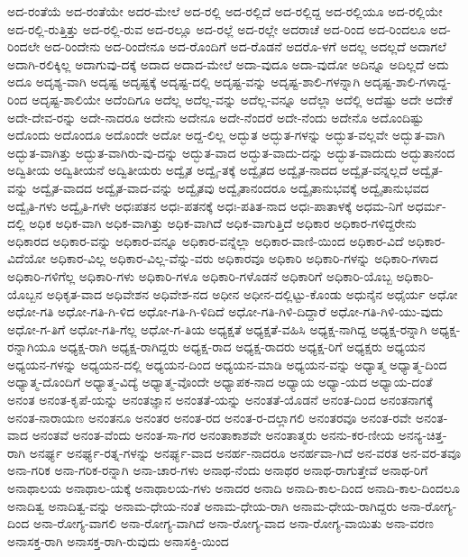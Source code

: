 {ಅದ-ರಂತೆಯೆ
ಅದ-ರಂತೆಯೇ
ಅದರ-ಮೇಲೆ
ಅದ-ರಲ್ಲಿ
ಅದ-ರಲ್ಲಿದೆ
ಅದ-ರಲ್ಲಿದ್ದ
ಅದ-ರಲ್ಲಿಯೂ
ಅದ-ರಲ್ಲಿಯೇ
ಅದ-ರಲ್ಲಿ-ರುತ್ತಿತ್ತು
ಅದ-ರಲ್ಲಿ-ರುವ
ಅದ-ರಲ್ಲೂ
ಅದ-ರಲ್ಲೆ
ಅದ-ರಲ್ಲೇ
ಅದರಾಚೆ
ಅದ-ರಿಂದ
ಅದ-ರಿಂದಲೂ
ಅದ-ರಿಂದಲೇ
ಅದ-ರಿಂದೇನು
ಅದ-ರಿಂದೇನೂ
ಅದ-ರೊಂದಿಗೆ
ಅದ-ರೊಡನೆ
ಅದರೊ-ಳಗೆ
ಅದಲ್ಲ
ಅದಲ್ಲದೆ
ಅದಾಗಲೆ
ಅದಾಗಿ-ರಲಿಕ್ಕಿಲ್ಲ
ಅದಾಗುವು-ದಕ್ಕೆ
ಅದಾದ
ಅದಾದ-ಮೇಲೆ
ಅದಾ-ವುದೂ
ಅದಾ-ವುದೋ
ಅದಿನ್ನೂ
ಅದಿಲ್ಲದೆ
ಅದು
ಅದೂ
ಅದೃಶ್ಯ-ವಾಗಿ
ಅದೃಷ್ಟ
ಅದೃಷ್ಟಕ್ಕೆ
ಅದೃಷ್ಟ-ದಲ್ಲಿ
ಅದೃಷ್ಟ-ವನ್ನು
ಅದೃಷ್ಟ-ಶಾಲಿ-ಗಳನ್ನಾಗಿ
ಅದೃಷ್ಟ-ಶಾಲಿ-ಗಳಾದ್ದ-ರಿಂದ
ಅದೃಷ್ಟ-ಶಾಲಿಯೇ
ಅದೆಂದಿಗೂ
ಅದೆಲ್ಲ
ಅದೆಲ್ಲ-ವನ್ನು
ಅದೆಲ್ಲ-ವನ್ನೂ
ಅದೆಲ್ಲಾ
ಅದೆಲ್ಲಿ
ಅದೆಷ್ಟು
ಅದೇ
ಅದೇಕೆ
ಅದೇ-ದೇವ-ರನ್ನು
ಅದೇ-ನಾದರೂ
ಅದೇನು
ಅದೇನೂ
ಅದೇ-ನೆಂದರೆ
ಅದೇ-ನೆಂದು
ಅದೇನೊ
ಅದೊಂದಿಷ್ಟು
ಅದೊಂದು
ಅದೊಂದೂ
ಅದೊಂದೇ
ಅದೋ
ಅದ್ದ-ಲಿಲ್ಲ
ಅದ್ಭುತ
ಅದ್ಭುತ-ಗಳನ್ನು
ಅದ್ಭುತ-ವಲ್ಲವೇ
ಅದ್ಭುತ-ವಾಗಿ
ಅದ್ಭುತ-ವಾಗಿತ್ತು
ಅದ್ಭುತ-ವಾಗಿರು-ವು-ದನ್ನು
ಅದ್ಭುತ-ವಾದ
ಅದ್ಭುತ-ವಾದು-ದನ್ನು
ಅದ್ಭುತ-ವಾದುದು
ಅದ್ಭುತಾನಂದ
ಅದ್ವಿತೀಯ
ಅದ್ವಿತೀಯನೆ
ಅದ್ವಿತೀಯರು
ಅದ್ವೈತ
ಅದ್ವೈ-ತಕ್ಕೆ
ಅದ್ವೈತದ
ಅದ್ವೈತ-ನಾದದ
ಅದ್ವೈತ-ವನ್ನಲ್ಲದೆ
ಅದ್ವೈತ-ವನ್ನು
ಅದ್ವೈತ-ವಾದದ
ಅದ್ವೈತ-ವಾದ-ವನ್ನು
ಅದ್ವೈತವು
ಅದ್ವೈತಾನಂದರೂ
ಅದ್ವೈತಾನುಭವಕ್ಕೆ
ಅದ್ವೈತಾನುಭವದ
ಅದ್ವೈತಿ-ಗಳು
ಅದ್ವೈತಿ-ಗಳೇ
ಅಧಃಪತನ
ಅಧಃ-ಪತನಕ್ಕೆ
ಅಧಃ-ಪತಿತ-ನಾದ
ಅಧಃ-ಪಾತಾಳಕ್ಕೆ
ಅಧಮ-ನಿಗೆ
ಅಧರ್ಮ-ದಲ್ಲಿ
ಅಧಿಕ
ಅಧಿಕ-ವಾಗಿ
ಅಧಿಕ-ವಾಗಿತ್ತು
ಅಧಿಕ-ವಾಗಿದೆ
ಅಧಿಕ-ವಾಗುತ್ತಿದೆ
ಅಧಿಕಾರ
ಅಧಿಕಾರ-ಗಳಿದ್ದರೇನು
ಅಧಿಕಾರದ
ಅಧಿಕಾರ-ವನ್ನು
ಅಧಿಕಾರ-ವನ್ನೂ
ಅಧಿಕಾರ-ವನ್ನೆಲ್ಲಾ
ಅಧಿಕಾರ-ವಾಣಿ-ಯಿಂದ
ಅಧಿಕಾರ-ವಿದೆ
ಅಧಿಕಾರ-ವಿದೆಯೋ
ಅಧಿಕಾರ-ವಿಲ್ಲ
ಅಧಿಕಾರ-ವಿಲ್ಲ-ವೆನ್ನು-ವರು
ಅಧಿಕಾರವೂ
ಅಧಿಕಾರಿ
ಅಧಿಕಾರಿ-ಗಳನ್ನು
ಅಧಿಕಾರಿ-ಗಳಾದ
ಅಧಿಕಾರಿ-ಗಳಿಗೆಲ್ಲ
ಅಧಿಕಾರಿ-ಗಳು
ಅಧಿಕಾರಿ-ಗಳೂ
ಅಧಿಕಾರಿ-ಗಳೊಡನೆ
ಅಧಿಕಾರಿಗೆ
ಅಧಿಕಾರಿ-ಯೊಬ್ಬ
ಅಧಿಕಾರಿ-ಯೊಬ್ಬನ
ಅಧಿಕೃತ-ವಾದ
ಅಧಿವೇಶನ
ಅಧಿವೇಶ-ನದ
ಅಧೀನ
ಅಧೀನ-ದಲ್ಲಿಟ್ಟು-ಕೊಂಡು
ಅಧುನೈನ
ಅಧೈರ್ಯ
ಅಧೋ
ಅಧೋ-ಗತಿ
ಅಧೋ-ಗತಿ-ಗಿ-ಳಿದ
ಅಧೋ-ಗತಿ-ಗಿ-ಳಿದಿದೆ
ಅಧೋ-ಗತಿ-ಗಿಳಿ-ದಿದ್ದಾರೆ
ಅಧೋ-ಗತಿ-ಗಿಳಿ-ಯು-ವುದು
ಅಧೋ-ಗ-ತಿಗೆ
ಅಧೋ-ಗತಿ-ಗೆಲ್ಲ
ಅಧೋ-ಗ-ತಿಯ
ಅಧ್ಯಕ್ಷತೆ
ಅಧ್ಯಕ್ಷತೆ-ವಹಿಸಿ
ಅಧ್ಯಕ್ಷ-ನಾಗಿದ್ದ
ಅಧ್ಯಕ್ಷ-ರನ್ನಾಗಿ
ಅಧ್ಯಕ್ಷ-ರನ್ನಾಗಿಯೂ
ಅಧ್ಯಕ್ಷ-ರಾಗಿ
ಅಧ್ಯಕ್ಷ-ರಾಗಿದ್ದರು
ಅಧ್ಯಕ್ಷ-ರಾದ
ಅಧ್ಯಕ್ಷ-ರಾದರು
ಅಧ್ಯಕ್ಷ-ರಿಗೆ
ಅಧ್ಯಕ್ಷರು
ಅಧ್ಯಯನ
ಅಧ್ಯಯನ-ಗಳನ್ನು
ಅಧ್ಯಯನ-ದಲ್ಲಿ
ಅಧ್ಯಯನ-ದಿಂದ
ಅಧ್ಯಯನ-ಮಾಡಿ
ಅಧ್ಯಯನ-ವನ್ನು
ಅಧ್ಯಾತ್ಮ
ಅಧ್ಯಾತ್ಮ-ದಿಂದ
ಅಧ್ಯಾತ್ಮ-ದೊಂದಿಗೆ
ಅಧ್ಯಾತ್ಮ-ವಿದ್ಯೆ
ಅಧ್ಯಾತ್ಮ-ವೊಂದೇ
ಅಧ್ಯಾಪಕ-ನಾದ
ಅಧ್ಯಾಯ
ಅಧ್ಯಾ-ಯದ
ಅಧ್ಯಾಯ-ದಂತೆ
ಅನಂತ
ಅನಂತ-ಕೃಪೆ-ಯನ್ನು
ಅನಂತಜ್ಞಾನ
ಅನಂತತೆ-ಯನ್ನು
ಅನಂತತೆ-ಯೊಡನೆ
ಅನಂತ-ದಿಂದ
ಅನಂತನಾಗಕ್ಕೆ
ಅನಂತ-ನಾರಾಯಣ
ಅನಂತನೂ
ಅನಂತರ
ಅನಂತ-ರದ
ಅನಂತ-ರ-ದಲ್ಲಾಗಲಿ
ಅನಂತರವೂ
ಅನಂತ-ರವೇ
ಅನಂತ-ವಾದ
ಅನಂತವೆ
ಅನಂತ-ವೆಂದು
ಅನಂತ-ಸಾ-ಗರ
ಅನಂತಾಕಾಶವೇ
ಅನಂತಾತ್ಮರು
ಅನನು-ಕರ-ಣೀಯ
ಅನನ್ಯ-ಚಿತ್ತ-ರಾಗಿ
ಅನರ್ಘ್ಯ
ಅನರ್ಘ್ಯ-ರತ್ನ-ಗಳನ್ನು
ಅನರ್ಘ್ಯ-ವಾದ
ಅನರ್ಹ-ನಾದರೂ
ಅನರ್ಹವಾ-ಗಿದೆ
ಅನ-ವರತ
ಅನ-ವರ-ತವೂ
ಅನಾ-ಗರಿಕ
ಅನಾ-ಗರಿಕ-ರನ್ನಾಗಿ
ಅನಾ-ಚಾರ-ಗಳು
ಅನಾಥ-ನೆಂದು
ಅನಾಥರ
ಅನಾಥ-ರಾಗುತ್ತೇವೆ
ಅನಾಥ-ರಿಗೆ
ಅನಾಥಾಲಯ
ಅನಾಥಾಲ-ಯಕ್ಕೆ
ಅನಾಥಾಲಯ-ಗಳು
ಅನಾದರ
ಅನಾದಿ
ಅನಾದಿ-ಕಾಲ-ದಿಂದ
ಅನಾದಿ-ಕಾಲ-ದಿಂದಲೂ
ಅನಾದಿತ್ವ
ಅನಾದಿತ್ವ-ವನ್ನು
ಅನಾಮ-ಧೇಯ-ನಂತೆ
ಅನಾಮ-ಧೇಯ-ರಾಗಿ
ಅನಾಮ-ಧೇಯ-ರಾಗಿದ್ದರು
ಅನಾ-ರೋಗ್ಯ-ದಿಂದ
ಅನಾ-ರೋಗ್ಯ-ವಾಗಲಿ
ಅನಾ-ರೋಗ್ಯ-ವಾಗಿದೆ
ಅನಾ-ರೋಗ್ಯ-ವಾದ
ಅನಾ-ರೋಗ್ಯ-ವಾಯಿತು
ಅನಾ-ವರಣ
ಅನಾಸಕ್ತ-ರಾಗಿ
ಅನಾಸಕ್ತ-ರಾಗಿ-ರುವುದು
ಅನಾಸಕ್ತಿ-ಯಿಂದ
}
